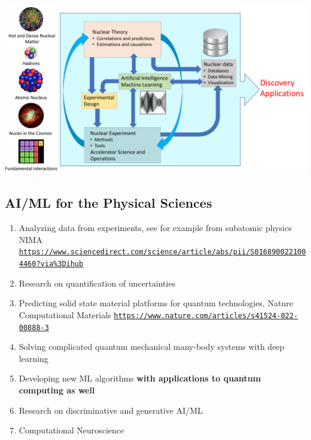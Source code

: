 \documentclass[%
oneside,                 %
final,                   %
10pt]{article}
\begin{document}
\centerline{\includegraphics[width=1.0\linewidth]{figures/ML-NP.pdf}}

\vspace{6mm}

\subsection{AI/ML for the Physical Sciences}

\begin{block}{}
\begin{enumerate}
\item Analyzing data from experiments, see for example from subatomic physics NIMA \href{{https://www.sciencedirect.com/science/article/abs/pii/S0168900221004460?via%3Dihub}}{\nolinkurl{https://www.sciencedirect.com/science/article/abs/pii/S0168900221004460?via\%3Dihub}}

\item Research on quantification of uncertainties

\item Predicting solid state material platforms for quantum technologies, Nature Computational Materials \href{{https://www.nature.com/articles/s41524-022-00888-3}}{\nolinkurl{https://www.nature.com/articles/s41524-022-00888-3}}

\item Solving complicated quantum mechanical many-body systems with deep learning

\item Developing new ML  algorithms \textbf{with applications to quantum computing as well}

\item Research on discriminative and generative AI/ML

\item Computational Neuroscience
\end{enumerate}

\noindent
\end{block}
\end{document}
